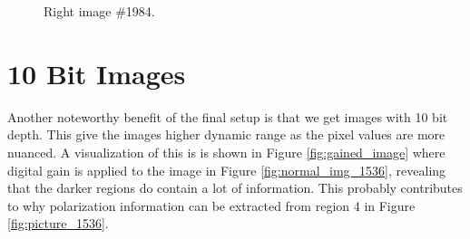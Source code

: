 \begin{figure}[H]
    \centering
    \caption{Right image \#1984.
        \label{fig:picture_1984_right}}
    \label{fig:picture_1984}
\end{figure}

\section{10 Bit Images}
Another noteworthy benefit of the final setup is that we get images with 10 bit depth.
This give the images higher dynamic range as the pixel values are more nuanced.
A visualization of this is is shown in Figure \ref{fig:gained_image} where digital gain is applied to the image in Figure \ref{fig:normal_img_1536}, revealing that the darker regions do contain a lot of information.
This probably contributes to why polarization information can be extracted from region 4 in Figure \ref{fig:picture_1536}.

